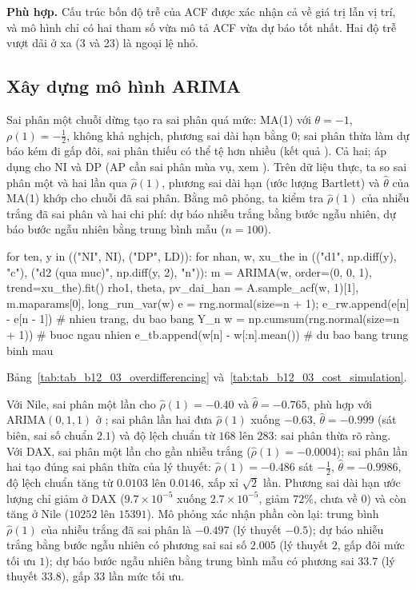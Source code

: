  \textbf{Phù hợp.} Cấu trúc bốn độ trễ của ACF được xác nhận cả về giá trị lẫn vị trí, và mô hình chỉ có hai tham số vừa mô tả ACF vừa dự báo tốt nhất. Hai độ trễ vượt dải ở xa (3 và 23) là ngoại lệ nhỏ.

\subsection{Xây dựng mô hình ARIMA}

 Sai phân một chuỗi dừng tạo ra sai phân quá mức: MA(1) với $\theta=-1$, $\rho(1)=-\tfrac12$, không khả nghịch, phương sai dài hạn bằng $0$; sai phân thừa làm dự báo kém đi gấp đôi, sai phân thiếu có thể tệ hơn nhiều (kết quả ).
 Cả hai; áp dụng cho NI và DP (AP cần sai phân mùa vụ, xem ). Trên dữ liệu thực, ta so sai phân một và hai lần qua $\hat\rho(1)$, phương sai dài hạn (ước lượng Bartlett) và $\hat\theta$ của MA(1) khớp cho chuỗi đã sai phân. Bằng mô phỏng, ta kiểm tra $\hat\rho(1)$ của nhiễu trắng đã sai phân và hai chi phí: dự báo nhiễu trắng bằng bước ngẫu nhiên, dự báo bước ngẫu nhiên bằng trung bình mẫu ($n=100$).
\begin{codeblock}
for ten, y in (("NI", NI), ("DP", LD)):
    for nhan, w, xu_the in (("d1", np.diff(y), "c"), ("d2 (qua muc)", np.diff(y, 2), "n")):
        m = ARIMA(w, order=(0, 0, 1), trend=xu_the).fit()
        rho1, theta, pv_dai_han = A.sample_acf(w, 1)[1], m.maparams[0], long_run_var(w)
e = rng.normal(size=n + 1); e_rw.append(e[n] - e[n - 1])      # nhieu trang, du bao bang Y_n
w = np.cumsum(rng.normal(size=n + 1))                         # buoc ngau nhien
e_tb.append(w[n] - w[:n].mean())                              # du bao bang trung binh mau
\end{codeblock}
 Bảng~\ref{tab:tab_b12_03_overdifferencing} và~\ref{tab:tab_b12_03_cost_simulation}.


 Với Nile, sai phân một lần cho $\hat\rho(1)=-0.40$ và $\hat\theta=-0.765$, phù hợp với ARIMA$(0,1,1)$ ở ; sai phân lần hai đưa $\hat\rho(1)$ xuống $-0.63$, $\hat\theta=-0.999$ (sát biên, sai số chuẩn $2.1$) và độ lệch chuẩn từ $168$ lên $283$: sai phân thừa rõ ràng. Với DAX, sai phân một lần cho gần nhiễu trắng ($\hat\rho(1)=-0.0004$); sai phân lần hai tạo đúng sai phân thừa của lý thuyết: $\hat\rho(1)=-0.486$ sát $-\tfrac12$, $\hat\theta=-0.9986$, độ lệch chuẩn tăng từ $0.0103$ lên $0.0146$, xấp xỉ $\sqrt2$ lần. Phương sai dài hạn ước lượng chỉ giảm ở DAX ($9.7\times10^{-5}$ xuống $2.7\times10^{-5}$, giảm $72\%$, chưa về $0$) và còn tăng ở Nile ($10252$ lên $15391$). Mô phỏng xác nhận phần còn lại: trung bình $\hat\rho(1)$ của nhiễu trắng đã sai phân là $-0.497$ (lý thuyết $-0.5$); dự báo nhiễu trắng bằng bước ngẫu nhiên có phương sai sai số $2.005$ (lý thuyết $2$, gấp đôi mức tối ưu $1$); dự báo bước ngẫu nhiên bằng trung bình mẫu có phương sai $33.7$ (lý thuyết $33.8$), gấp $33$ lần mức tối ưu.

